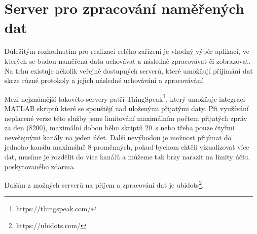 \chapter{Server pro zpracování naměřených dat}

Důležitým rozhodnutím pro realizaci celého zařízení je vhodný výběr aplikací, ve kterých se budou naměřená data uchovávat a následně zpracovávat či zobrazovat. Na trhu existuje několik veřejně dostupných serverů, které umožňují přijímání dat skrze různé protokoly a jejich následné uchovávání a zpracovávání.

Mezi nejznámější takovéto servery patří ThingSpeak\footnote{https://thingspeak.com/}, který umožňuje integraci MATLAB skriptů které se spouštějí nad uloženými přijatými daty. Při využívání neplacené verze této služby jsme limitování maximálním počtem přijatých zpráv za den (\SI{8200}{}), maximální dobou běhu skriptů \SI{20}{\second} nebo třeba pouze čtyřmi neveřejnými kanály na jeden účet. Další nevýhodou je možnost přijímat do jednoho kanálu maximálně 8 proměnných, pokud bychom chtěli vizualizovat více dat, musíme je rozdělit do více kanálů a můžeme tak brzy narazit na limity účtu poskytovaného zdarma.

Dalším z možných serverů na příjem a zpracování dat je ubidots\footnote{https://ubidots.com/}.